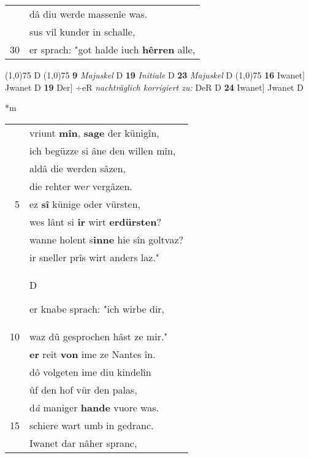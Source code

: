 \documentclass[8pt,a4paper,notitlepage]{article}
\begin{document}
\begin{table}[ht]
\begin{minipage}[t]{0.5\linewidth}
\begin{tabular}{rl}
 & dâ diu werde massenîe was.\\ 
 & sus vil kunder in schalle,\\ 
30 & er sprach: "got halde iuch \textbf{hêrren} alle,\\ 
\end{tabular}
\scriptsize
\line(1,0){75} \newline
D \newline
\line(1,0){75} \newline
\textbf{9} \textit{Majuskel} D  \textbf{19} \textit{Initiale} D  \textbf{23} \textit{Majuskel} D  \newline
\line(1,0){75} \newline
\textbf{16} Iwanet] Jwanet D \textbf{19} Der] ÷eR \textit{nachträglich korrigiert zu:} DeR D \textbf{24} Iwanet] Jwanet D \newline
\end{minipage}
\hspace{0.5cm}
\begin{minipage}[t]{0.5\linewidth}
\small
\begin{center}*m
\end{center}
\begin{tabular}{rl}
 & vriunt \textbf{mîn}, \textbf{sage} der künigîn,\\ 
 & ich begüzze si âne den willen mîn,\\ 
 & aldâ die werden sâzen,\\ 
 & die rehter we\textit{r} vergâzen.\\ 
5 & ez \textbf{sî} künige oder vürsten,\\ 
 & wes lânt si \textbf{ir} wirt \textbf{erdürsten}?\\ 
 & wanne holent s\textbf{inne} hie sîn goltvaz?\\ 
 & ir sneller prîs wirt anders laz."\\ 
 & \begin{large}D\end{large}er knabe sprach: "ich wirbe dir,\\ 
10 & waz dû gesprochen hâst ze mir."\\ 
 & \textbf{er} reit \textbf{von} ime ze Nantes în.\\ 
 & dô volgeten ime diu kindelîn\\ 
 & ûf den hof vür den palas,\\ 
 & d\textit{â} maniger \textbf{hande} vuore was.\\ 
15 & schiere wart umb in gedranc.\\ 
 & Iwanet dar nâher spranc,\\ 

\end{tabular}
\end{minipage}
\end{table}
\end{document}
